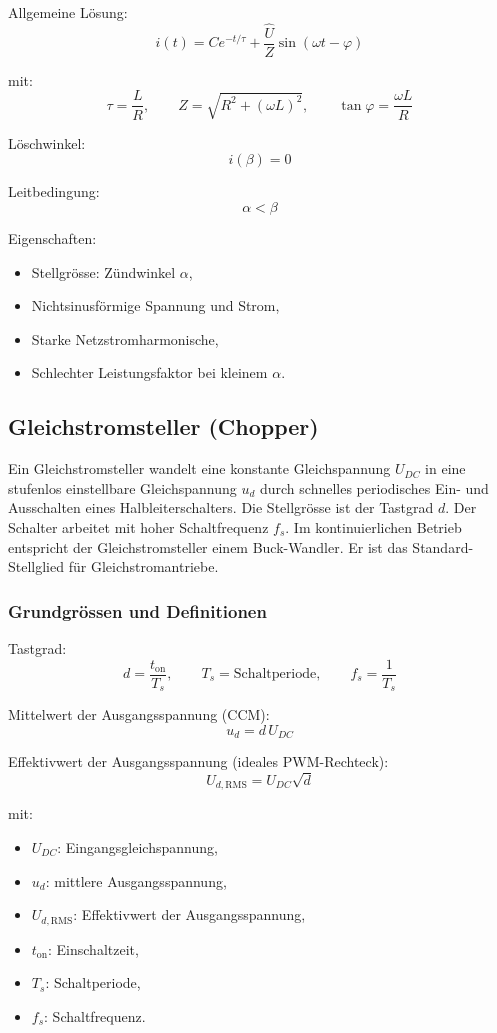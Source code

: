 Allgemeine Lösung:
\[
\boxed{
i(t)=C e^{-t/\tau}+\frac{\hat U}{Z}\sin(\omega t-\varphi)
}
\]

mit:
\[
\tau=\frac{L}{R},\qquad
Z=\sqrt{R^2+(\omega L)^2},\qquad
\tan\varphi=\frac{\omega L}{R}
\]

Löschwinkel:
\[
\boxed{i(\beta)=0}
\]

Leitbedingung:
\[
\boxed{\alpha<\beta}
\]

Eigenschaften:
\begin{itemize}
\item Stellgrösse: Zündwinkel $\alpha$,
\item Nichtsinusförmige Spannung und Strom,
\item Starke Netzstromharmonische,
\item Schlechter Leistungsfaktor bei kleinem $\alpha$.
\end{itemize}

\subsection{Gleichstromsteller (Chopper)}

Ein Gleichstromsteller wandelt eine konstante Gleichspannung $U_{DC}$
in eine stufenlos einstellbare Gleichspannung $u_d$
durch schnelles periodisches Ein- und Ausschalten eines Halbleiterschalters.
Die Stellgrösse ist der Tastgrad $d$.
Der Schalter arbeitet mit hoher Schaltfrequenz $f_s$.
Im kontinuierlichen Betrieb entspricht der Gleichstromsteller einem Buck-Wandler.
Er ist das Standard-Stellglied für Gleichstromantriebe.

\subsubsection{Grundgrössen und Definitionen}

Tastgrad:
\[
\boxed{d=\frac{t_{\mathrm{on}}}{T_s}}, 
\qquad
T_s=\text{Schaltperiode}, 
\qquad
f_s=\frac{1}{T_s}
\]

Mittelwert der Ausgangsspannung (CCM):
\[
\boxed{u_d=d\,U_{DC}}
\]

Effektivwert der Ausgangsspannung (ideales PWM-Rechteck):
\[
\boxed{U_{d,\mathrm{RMS}}=U_{DC}\sqrt{d}}
\]

mit:
\begin{itemize}
\item $U_{DC}$: Eingangsgleichspannung,
\item $u_d$: mittlere Ausgangsspannung,
\item $U_{d,\mathrm{RMS}}$: Effektivwert der Ausgangsspannung,
\item $t_{\mathrm{on}}$: Einschaltzeit,
\item $T_s$: Schaltperiode,
\item $f_s$: Schaltfrequenz.
\end{itemize}

